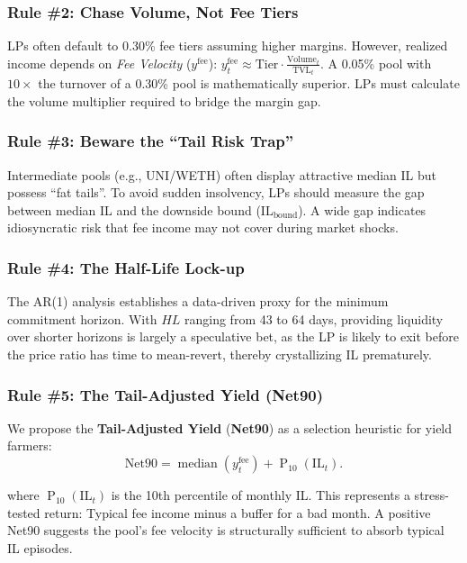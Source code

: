 \documentclass[journal]{IEEEtran}
\begin{document}
\subsubsection{Rule \#2: Chase Volume, Not Fee Tiers}
LPs often default to 0.30\% fee tiers assuming higher margins. However, realized income depends on \emph{Fee Velocity} ($y^{\text{fee}}$): \(
y^{\text{fee}}_t \approx \text{Tier} \cdot \frac{\text{Volume}_t}{\text{TVL}_t}
\).
A 0.05\% pool with $10\times$ the turnover of a 0.30\% pool is mathematically superior. LPs must calculate the volume multiplier required to bridge the margin gap.

\subsubsection{Rule \#3: Beware the ``Tail Risk Trap''}
Intermediate pools (e.g., UNI/WETH) often display attractive median IL but possess ``fat tails''. To avoid sudden insolvency, LPs should measure the gap between median IL and the downside bound ($\text{IL}_{\text{bound}}$). A wide gap indicates idiosyncratic risk that fee income may not cover during market shocks.

\subsubsection{Rule \#4: The Half-Life Lock-up}
The AR(1) analysis establishes a data-driven proxy for the minimum commitment horizon. With $HL$ ranging from 43 to 64 days, providing liquidity over shorter horizons is largely a speculative bet, as the LP is likely to exit before the price ratio has time to mean-revert, thereby crystallizing IL prematurely.


\subsubsection{Rule \#5: The Tail-Adjusted Yield (Net90)}
We propose the \textbf{Tail-Adjusted Yield} (\textbf{Net90}) as a selection heuristic for yield farmers:
\begin{equation}
\label{eq:net90}
\text{Net90}
= \operatorname{median}\!\left(y^{\text{fee}}_{t}\right)
+ \operatorname{P}_{10}\!\left(\mathrm{IL}_{t}\right).
\end{equation}

where $\operatorname{P}_{10}(\mathrm{IL}_t)$ is the 10th percentile of monthly IL. This represents a stress-tested return: Typical fee income minus a buffer for a bad month. A positive Net90 suggests the pool's fee velocity is structurally sufficient to absorb typical IL episodes.
\end{document}
